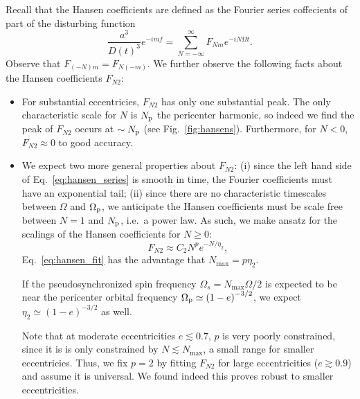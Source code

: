 \documentclass[
        fleqn,
        usenatbib,
        referee,
    ]{mnras}
\newcommand*{\p}[1]{\left(#1\right)}
\begin{document}
Recall that the Hansen coefficients are defined as the Fourier series coffecients
of part of the disturbing function
\begin{equation}
    \frac{a^3}{D(t)^3} e^{-imf} = \sum\limits_{N = -\infty}^\infty
        F_{Nm} e^{-iN\Omega t}.\label{eq:hansen_series}
\end{equation}
Observe that $F_{(-N)m} = F_{N(-m)}$. We further observe the following facts about
the Hansen coefficients $F_{N2}$:
\begin{itemize}
    \item For substantial eccentricies, $F_{N2}$ has only one substantial peak.
        The only characteristic scale for $N$ is $N_{\rm p}$ the pericenter
        harmonic, so indeed we find the peak of $F_{N2}$ occurs at $\sim N_{\rm
        p}$ (see Fig.~\ref{fig:hansens}). Furthermore, for $N < 0$, $F_{N2}
        \approx 0$ to good accuracy.

    \item We expect two more general properties about $F_{N2}$: (i) since the
        left hand side of Eq.~\eqref{eq:hansen_series} is smooth in time, the
        Fourier coefficients must have an exponential tail; (ii) since there are
        no characteristic timescales between $\Omega$ and $\Omega_{\rm p}$, we
        anticipate the Hansen coefficients must be scale free between $N = 1$
        and $N_{\rm p}$, i.e.\ a power law. As such, we make ansatz for the
        scalings of the Hansen coefficients for $N \geq 0$:
        \begin{equation}
            F_{N2} \approx C_2 N^{p}e^{-N/\eta_2},\label{eq:hansen_fit}
        \end{equation}
        Eq.~\eqref{eq:hansen_fit} has the advantage that $N_{\max} = p\eta_2$.

        If the pseudosynchronized spin frequency $\Omega_s = N_{\max}\Omega/2$
        is expected to be near the pericenter orbital frequency $\Omega_{\rm p}
        \simeq \p{1 - e}^{-3/2}$, we expect $\eta_2 \simeq \p{1 - e}^{-3/2}$
        as well.

        Note that at moderate eccentricities $e \lesssim 0.7$, $p$ is very
        poorly constrained, since it is is only constrained by $N \lesssim
        N_{\max}$, a small range for smaller eccentricies. Thus, we fix $p =
        2$ by fitting $F_{N2}$ for large eccentricities ($e \gtrsim 0.9$) and
        assume it is universal. We found indeed this proves robust to smaller
        eccentricities.
\end{itemize}
\end{document}
